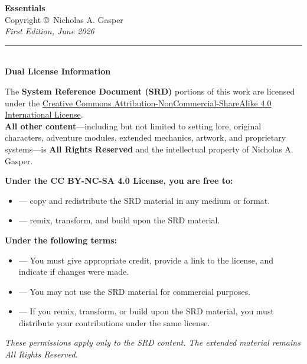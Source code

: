 \cleardoublepage
\thispagestyle{empty}
\begin{center}
  \vspace*{2in}
  {\LARGE\textbf{Essentials}}\\[0.3in]
  Copyright \copyright\ Nicholas A. Gasper\\[0.2in]
  \textit{First Edition, June 2026}\\[0.2in]

  \rule{0.6\textwidth}{0.4pt}\\[0.3in]

  \textbf{Dual License Information}\\[0.2in]

  \begin{minipage}{0.9\textwidth}
    \small
    The \textbf{System Reference Document (SRD)} portions of this work are licensed under the
    \href{http://creativecommons.org/licenses/by-nc-sa/4.0/}{Creative Commons Attribution-NonCommercial-ShareAlike 4.0 International License}.\\
    \vspace{0.1in}
    \textbf{All other content}---including but not limited to setting lore, original characters,
    adventure modules, extended mechanics, artwork, and proprietary systems---is
    \textbf{All Rights Reserved} and the intellectual property of Nicholas A. Gasper.
  \end{minipage}

  \vspace{0.3in}

  \begin{minipage}{0.9\textwidth}
    \small
    \textbf{Under the CC BY-NC-SA 4.0 License, you are free to:}
    \begin{itemize}
      \item[\textbf{Share}] --- copy and redistribute the SRD material in any medium or format.
      \item[\textbf{Adapt}] --- remix, transform, and build upon the SRD material.
    \end{itemize}
    \textbf{Under the following terms:}
    \begin{itemize}
      \item[\textbf{Attribution}] --- You must give appropriate credit, provide a link to the license,
            and indicate if changes were made.
      \item[\textbf{NonCommercial}] --- You may not use the SRD material for commercial purposes.
      \item[\textbf{ShareAlike}] --- If you remix, transform, or build upon the SRD material,
            you must distribute your contributions under the same license.
    \end{itemize}
    \textit{These permissions apply only to the SRD content. The extended material remains}
    \textit{All Rights Reserved.}
  \end{minipage}


\end{center}
